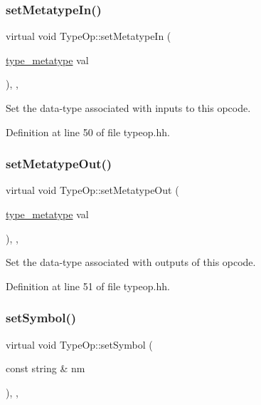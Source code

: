 \subsubsection{\texorpdfstring{setMetatypeIn()}{setMetatypeIn()}}
{\footnotesize\ttfamily virtual void Type\+Op\+::set\+Metatype\+In (\begin{DoxyParamCaption}\item[{\mbox{\hyperlink{type_8hh_aef6429f2523cdf4d415ba04a0209e61f}{type\+\_\+metatype}}}]{val }\end{DoxyParamCaption})\hspace{0.3cm}{\ttfamily [inline]}, {\ttfamily [protected]}, {\ttfamily [virtual]}}



Set the data-\/type associated with inputs to this opcode. 



Definition at line 50 of file typeop.\+hh.

\mbox{\label{class_type_op_a6c6e4e0f7aced28b8807f006e7ebc847}} 
\subsubsection{\texorpdfstring{setMetatypeOut()}{setMetatypeOut()}}
{\footnotesize\ttfamily virtual void Type\+Op\+::set\+Metatype\+Out (\begin{DoxyParamCaption}\item[{\mbox{\hyperlink{type_8hh_aef6429f2523cdf4d415ba04a0209e61f}{type\+\_\+metatype}}}]{val }\end{DoxyParamCaption})\hspace{0.3cm}{\ttfamily [inline]}, {\ttfamily [protected]}, {\ttfamily [virtual]}}



Set the data-\/type associated with outputs of this opcode. 



Definition at line 51 of file typeop.\+hh.

\mbox{\label{class_type_op_a55323290cba73850cb2968f4a0a090aa}} 
\subsubsection{\texorpdfstring{setSymbol()}{setSymbol()}}
{\footnotesize\ttfamily virtual void Type\+Op\+::set\+Symbol (\begin{DoxyParamCaption}\item[{const string \&}]{nm }\end{DoxyParamCaption})\hspace{0.3cm}{\ttfamily [inline]}, {\ttfamily [protected]}, {\ttfamily [virtual]}}



